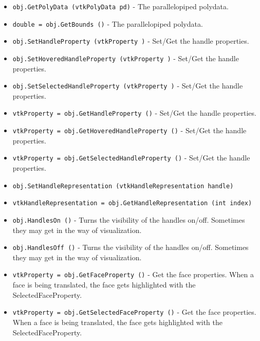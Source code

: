 \begin{itemize}
\item  \verb|obj.GetPolyData (vtkPolyData pd)| -  The parallelopiped polydata.

\item  \verb|double = obj.GetBounds ()| -  The parallelopiped polydata.

\item  \verb|obj.SetHandleProperty (vtkProperty )| -  Set/Get the handle properties. 

\item  \verb|obj.SetHoveredHandleProperty (vtkProperty )| -  Set/Get the handle properties. 

\item  \verb|obj.SetSelectedHandleProperty (vtkProperty )| -  Set/Get the handle properties. 

\item  \verb|vtkProperty = obj.GetHandleProperty ()| -  Set/Get the handle properties. 

\item  \verb|vtkProperty = obj.GetHoveredHandleProperty ()| -  Set/Get the handle properties. 

\item  \verb|vtkProperty = obj.GetSelectedHandleProperty ()| -  Set/Get the handle properties. 

\item  \verb|obj.SetHandleRepresentation (vtkHandleRepresentation handle)|

\item  \verb|vtkHandleRepresentation = obj.GetHandleRepresentation (int index)|

\item  \verb|obj.HandlesOn ()| -  Turns the visibility of the handles on/off. Sometimes they may get in
 the way of visualization.

\item  \verb|obj.HandlesOff ()| -  Turns the visibility of the handles on/off. Sometimes they may get in
 the way of visualization.

\item  \verb|vtkProperty = obj.GetFaceProperty ()| -  Get the face properties. When a face is being translated, the face gets
 highlighted with the SelectedFaceProperty.

\item  \verb|vtkProperty = obj.GetSelectedFaceProperty ()| -  Get the face properties. When a face is being translated, the face gets
 highlighted with the SelectedFaceProperty.


\end{itemize}
